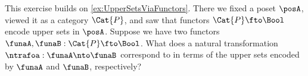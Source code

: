 \begin{marginfigure}
\begin{center}
\end{center}
\caption{}
  \label{fig:graph-cat-again}
\end{marginfigure}



\begin{gradedexercise}\label{ex:UpperSetsNatTrafos}
This exercise builds on \cref{ex:UpperSetsViaFunctors}. There we fixed a poset $\posA$, viewed it as a category $\Cat{P}$, and saw that functors $\Cat{P} \fto \Bool$ encode upper sets in $\posA$. Suppose we have two functors $\funaA, \funaB : \Cat{P} \fto \Bool$. What does a natural transformation $\ntrafoa : \funaA \nto \funaB$ correspond to in terms of the upper sets encoded by $\funaA$ and $\funaB$, respectively? 
\end{gradedexercise}






